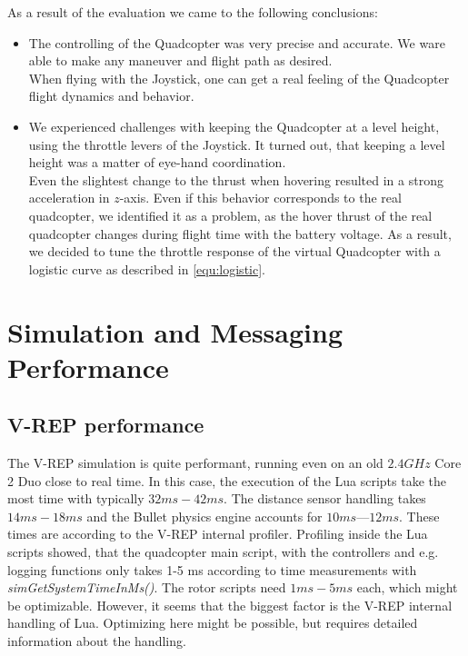 As a result of the evaluation we came to the following conclusions:

\begin{itemize}
\item{The controlling of the Quadcopter was very precise and accurate. 
We ware able to make any maneuver and flight path as desired. \\ 

When flying with the Joystick, one can get a real feeling of the Quadcopter flight dynamics and behavior}.

\item{We experienced challenges with keeping the Quadcopter at a level height, using the throttle levers of the Joystick. 
It turned out, that keeping a level height was a matter of eye-hand coordination. \\

Even the slightest change to the thrust when hovering resulted in a strong acceleration in $z$-axis. 
Even if this behavior corresponds to the real quadcopter, we identified it as a problem, as the hover thrust of the real quadcopter changes during flight time with the battery voltage. 
As a result, we decided to tune the throttle response of the virtual Quadcopter with a logistic curve as described in \ref{equ:logistic}}.

\end{itemize}

\section{Simulation and Messaging  Performance}
\label{sec:performance}
\subsection{V-REP performance}
 The V-REP simulation is quite performant, running even on an old $2.4 GHz$ Core 2 Duo close to real time.
 In this case, the execution of the Lua scripts take the most time with typically $32ms - 42ms$.
 The distance sensor handling takes $14ms - 18ms$ and the Bullet physics engine accounts for $10ms — 12ms$.
 These times are according to the V-REP internal profiler.
 Profiling inside the Lua scripts showed, that the quadcopter main script, with the controllers and e.g. logging functions only takes 1-5 ms according to time measurements with  \emph{simGetSystemTimeInMs()}.
 The rotor scripts need $1ms - 5ms$ each, which might be optimizable.
 However, it seems that the biggest factor is the V-REP internal handling of Lua.
 Optimizing here might be possible, but requires detailed information about the handling.
 
